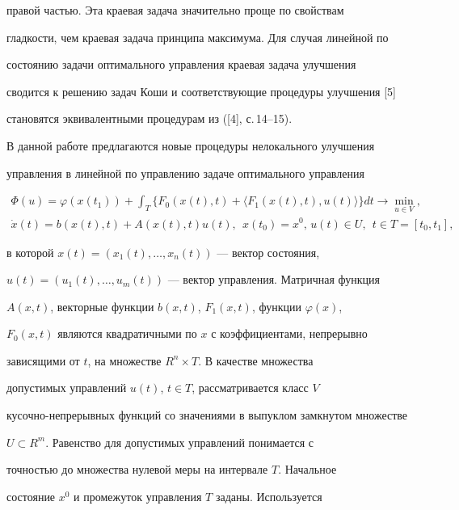 правой частью. Эта краевая задача значительно проще по свойствам


гладкости, чем краевая задача принципа максимума. Для случая линейной по


состоянию задачи оптимального управления краевая задача улучшения


сводится к решению задач Коши и соответствующие процедуры улучшения [5]


становятся эквивалентными процедурам из ([4], с.\,14--15).





В данной работе предлагаются новые процедуры нелокального улучшения


управления в линейной по управлению задаче оптимального управления


\begin{gather}


\Phi(u)=\varphi(x(t_1))+\int_{T}\{F_{0}(x(t),t)+


\langle{F_1}(x(t),t),u(t)\rangle\}dt\rightarrow\min\limits_{u\in{V}}, \\


%


\Dot{x}(t)=b(x(t),t)+A(x(t),t)u(t),\ \ x(t_{0})=x^0,\,u(t)\in{U},


\ \ t\in{T}=[t_0,t_1],


\end{gather}


в которой $x(t)=(x_{1}(t),\dotsc,x_{n}(t))$ --- вектор состояния,


$u(t)=(u_{1}(t),\dotsc,u_{m}(t))$ --- вектор управления. Матричная функция


$A(x,t)$, векторные функции $b(x,t)$, $F_{1}(x,t)$, функции $\varphi(x)$,


$F_{0}(x,t)$ являются квадратичными по $x$ с коэффициентами, непрерывно


зависящими от $t$, на множестве $R^n\times{T}$. В качестве множества


допустимых управлений $u(t)$, $t\in{T}$, рассматривается класс $V$ 


кусочно-непрерывных функций со значениями в выпуклом замкнутом множестве


$U\subset{R^m}$. Равенство для допустимых управлений понимается с


точностью до множества нулевой меры на интервале $T$. Начальное


состояние $x^{0}$ и промежуток управления $T$ заданы. Используется


